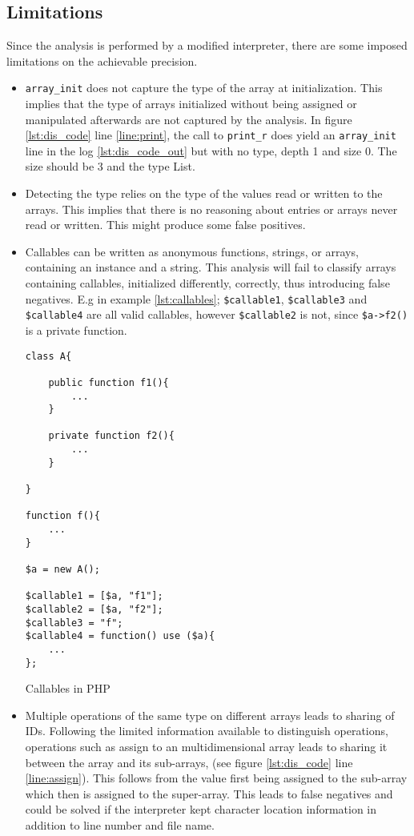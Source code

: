\subsection{Limitations}
Since the analysis is performed by a modified interpreter, there are some imposed limitations on the achievable precision. 

\begin{itemize}
\item  \texttt{array\_init} does not capture the type of the array at initialization. This implies that the type of arrays initialized without being assigned or manipulated afterwards are not captured by the analysis. In figure \ref{lst:dis_code} line \ref{line:print}, the call to \texttt{print\_r} does yield an \texttt{array\_init} line in the log \ref{lst:dis_code_out} but with no type, depth 1 and size 0. The size should be 3 and the type List.

\item Detecting the type relies on the type of the values read or written to the arrays. This implies that there is no reasoning about entries or arrays never read or written. This might produce some false positives.

\item Callables can be written as anonymous functions, strings, or arrays, containing an instance and a string. This analysis will fail to classify arrays containing callables, initialized differently, correctly, thus introducing false negatives. E.g in example \ref{lst:callables}; \texttt{\$callable1}, \texttt{\$callable3} and \texttt{\$callable4} are all valid callables, however \texttt{\$callable2} is not, since \texttt{\$a->f2()} is a private function.

\begin{program}
\centering
\begin{lstlisting}
class A{

    public function f1(){
        ...
    }

    private function f2(){
        ...
    }

}

function f(){
    ...
}

$a = new A();

$callable1 = [$a, "f1"];
$callable2 = [$a, "f2"];
$callable3 = "f";
$callable4 = function() use ($a){
    ...
};
\end{lstlisting}
\caption{Callables in PHP}
\label{lst:callables}
\end{program}

\item Multiple operations of the same type on different arrays leads to sharing of IDs. Following the limited information available to distinguish operations, operations such as assign to an multidimensional array leads to sharing it between the array and its sub-arrays, (see figure \ref{lst:dis_code} line \ref{line:assign}). This follows from the value first being assigned to the sub-array which then is assigned to the super-array. This leads to false negatives and could be solved if the interpreter kept character location information in addition to line number and file name.   

\end{itemize}

